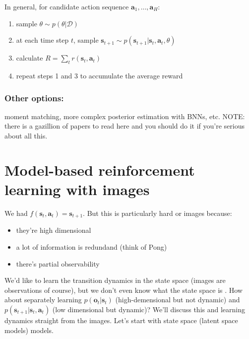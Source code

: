 \documentclass{report}
\begin{document}
In general, for candidate action sequence $ \bm{a}_{1}, \dots , \bm{a}_{H}$:
\begin{enumerate}
		\item sample $\theta \sim p(\theta|\mathcal{D})$
		\item at each time step $t$, sample $\bm{s}_{t+1} \sim p(\bm{s}_{t+1}| \bm{s}_{t}, \bm{a}_{t}, \theta)$
		\item calculate $R = \sum_{t}^{} r (\bm{s}_{t}, \bm{a}_{t} )$
		\item repeat steps 1 and 3 to accumulate the average reward
\end{enumerate}
\subsubsection{Other options:} moment matching, more complex posterior estimation with BNNs, etc.
NOTE: there is a gazillion of papers to read here and you should do it if you're serious about all this.

\section{Model-based reinforcement learning with images}
We had $f (\bm{s}_{t}, \bm{a}_{t} )= \bm{s}_{t+1}$.
But this is particularly hard or images because:
\begin{itemize}
		\item they're high dimensional
		\item a lot of information is redundand (think of Pong)
		\item there's partial observability
\end{itemize}
We'd like to learn the transition dynamics in the state space (images are observations of course), 
but we don't even know what the state space is .
How about separately learning $p(\bm{o}_{t}| \bm{s}_{t})$ (high-demensional but not dynamic) 
and $p(\bm{s}_{t+1}|\bm{s}_{t}, \bm{a}_{t})$ (low dimensional but dynamic)?
We'll discuss this and learning dynamics straight from the images.
Let's start with state space (latent space models) models.
\end{document}

